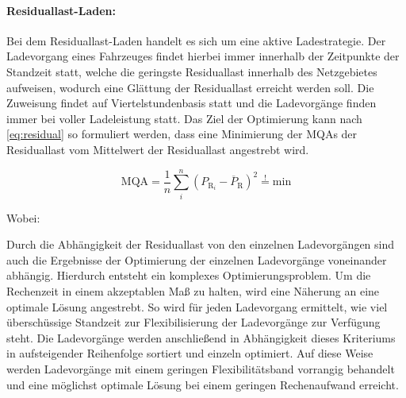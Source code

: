 

\paragraph{Residuallast-Laden:}

Bei dem Residuallast-Laden handelt es sich um eine aktive Ladestrategie.
Der Ladevorgang eines Fahrzeuges findet hierbei immer innerhalb der Zeitpunkte der Standzeit statt, welche die geringste Residuallast innerhalb des Netzgebietes aufweisen, wodurch eine Glättung der Residuallast erreicht werden soll.
Die Zuweisung findet auf Viertelstundenbasis statt und die Ladevorgänge finden immer bei voller Ladeleistung statt.
Das Ziel der Optimierung kann nach \autoref{eq:residual} so formuliert werden, dass eine Minimierung der \glspl{MQA} der Residuallast vom Mittelwert der Residuallast angestrebt wird.

\begin{equation}
	\text{MQA} = \frac{1}{n} \sum_i^n \left( P_{\text{R}_i} - \overline{P}_{\text{R}} \right)^2 \stackrel{!}{=} \text{min}
	\label{eq:residual}
\end{equation}

\noindent Wobei:


Durch die Abhängigkeit der Residuallast von den einzelnen Ladevorgängen sind auch die Ergebnisse der Optimierung der einzelnen Ladevorgänge voneinander abhängig.
Hierdurch entsteht ein komplexes Optimierungsproblem.
Um die Rechenzeit in einem akzeptablen Maß zu halten, wird eine Näherung an eine optimale Lösung angestrebt.
So wird für jeden Ladevorgang ermittelt, wie viel überschüssige Standzeit zur Flexibilisierung der Ladevorgänge zur Verfügung steht.
Die Ladevorgänge werden anschließend in Abhängigkeit dieses Kriteriums in aufsteigender Reihenfolge sortiert und einzeln optimiert.
Auf diese Weise werden Ladevorgänge mit einem geringen Flexibilitätsband vorrangig behandelt und eine möglichst optimale Lösung bei einem geringen Rechenaufwand erreicht.


